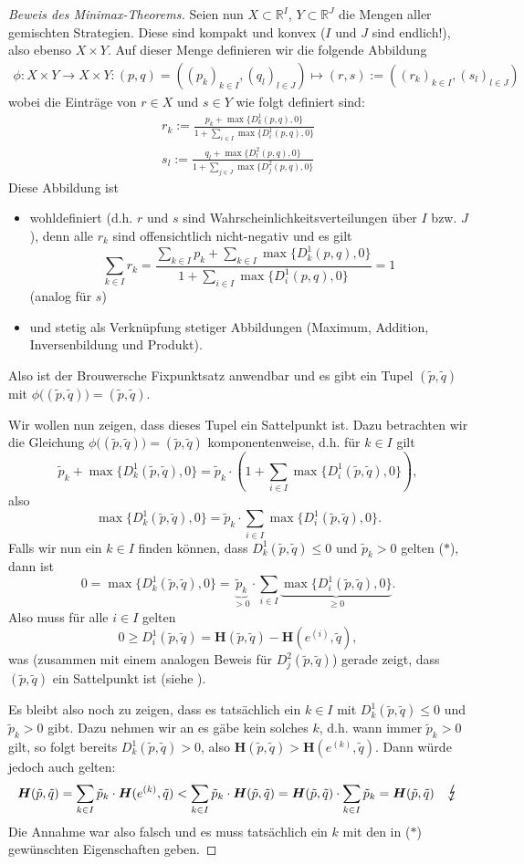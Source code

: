 \documentclass[a4paper,ngerman,12pt,bibtotoc]{scrartcl}
\theoremstyle{definition}
\theoremstyle{plain}
\theoremstyle{remark}
\newcommand{\RR}{\mathbb{R}}
\renewcommand{\_}{\mathpunct{.}\,}
\newcommand{\?}{\,{:}\,}
\renewcommand{\sp}{\tilde{p}}		%
\newcommand{\sq}{\tilde{q}}		%
\newcommand{\EH}{\boldsymbol{H}}
\begin{document}
\begin{proof}[Beweis des Minimax-Theorems]
		Seien nun $X \subset \RR^I$, $Y \subset \RR^J$ die Mengen aller gemischten Strategien. Diese sind kompakt und konvex ($I$ und $J$ sind endlich!), also ebenso $X\times Y$. Auf dieser Menge definieren wir die folgende Abbildung
		\begin{align*}
			\phi: X\times Y \to X\times Y: (p,q) = \left((p_k)_{k\in I}, (q_l)_{l\in J}\right) \mapsto (r,s) := \left((r_k)_{k\in I}, (s_l)_{l\in J}\right)
		\end{align*}
		wobei die Einträge von $r\in X$ und $s\in Y$ wie folgt definiert sind:
		\begin{align*}
			r_k := \frac{p_k + \max\{D^1_k(p,q),0\}}{1+\sum_{i\in I}\max\{D^1_i(p,q),0\}} \\
			s_l := \frac{q_l + \max\{D^2_l(p,q),0\}}{1+\sum_{j\in J}\max\{D^2_j(p,q),0\}}
		\end{align*}
		Diese Abbildung ist
		\begin{itemize}
			\item wohldefiniert (d.h. $r$ und $s$ sind Wahrscheinlichkeitsverteilungen über $I$ bzw. $J$), denn alle $r_k$ sind offensichtlich nicht-negativ und es gilt 
				\[\sum_{k\in I} r_k = \frac{\sum_{k\in I}p_k + \sum_{k\in I}\max\{D^1_k(p,q),0\}}{1+\sum_{i\in I}\max\{D^1_i(p,q),0\}} = 1\]
			(analog für $s$)
			\item und stetig als Verknüpfung stetiger Abbildungen (Maximum, Addition, Inversenbildung und Produkt).
		\end{itemize}
		Also ist der Brouwersche Fixpunktsatz anwendbar und es gibt ein Tupel $(\sp,\sq)$ mit $\phi\big((\sp,\sq)\big) = (\sp,\sq)$. 
		
		Wir wollen nun zeigen, dass dieses Tupel ein Sattelpunkt ist. Dazu betrachten wir die Gleichung $\phi\big((\sp,\sq)\big) = (\sp,\sq)$ komponentenweise, d.h. für $k \in I$ gilt 
			\[\sp_k + \max\{D^1_k(\sp,\sq),0\} = \sp_k\cdot\left(1+\sum_{i\in I}\max\{D^1_i(\sp,\sq),0\}\right),\]
		also
			\[\max\{D^1_k(\sp,\sq),0\} = \sp_k\cdot\sum_{i\in I}\max\{D^1_i(\sp,\sq),0\}.\]
		Falls wir nun ein $k \in I$ finden können, dass $D^1_k(\sp,\sq) \leq 0$ und $\sp_k > 0$ gelten ($\ast$), dann ist
			\[0 = \max\{D^1_k(\sp,\sq),0\} = \underbrace{\sp_k}_{> 0}\cdot\sum_{i\in I}\underbrace{\max\{D^1_i(\sp,\sq),0\}}_{\geq 0}.\]
		Also muss für alle $i \in I$ gelten
			\[0 \geq D^1_i(\sp,\sq) = \EH(\sp,\sq) - \EH(e^{(i)},\sq),\]
		was (zusammen mit einem analogen Beweis für $D^2_j(\sp,\sq)$) gerade zeigt, dass $(\sp,\sq)$ ein Sattelpunkt ist (siehe ).
		
		Es bleibt also noch zu zeigen, dass es tatsächlich ein $k \in I$ mit $D^1_k(\sp,\sq) \leq 0$ und $\sp_k > 0$ gibt. Dazu nehmen wir an es gäbe kein solches $k$, d.h. wann immer $\sp_k > 0$ gilt, so folgt bereits $D^1_k(\sp,\sq) > 0$, also $\EH(\sp,\sq) > \EH(e^{(k)},\sq)$. Dann würde jedoch auch gelten:
			\[\EH(\sp,\sq) = \sum_{k\in I}\sp_k\cdot \EH(e^{(k)},\sq) < \sum_{k\in I}\sp_k\cdot \EH(\sp,\sq) = \EH(\sp,\sq) \cdot \sum_{k\in I}\sp_k = \EH(\sp,\sq) \hspace{1em} \mbox{\Large $\lightning$}\] 
		Die Annahme war also falsch und es muss tatsächlich ein $k$ mit den in ($\ast$) gewünschten Eigenschaften geben.
	\end{proof}	
	
\end{document}
